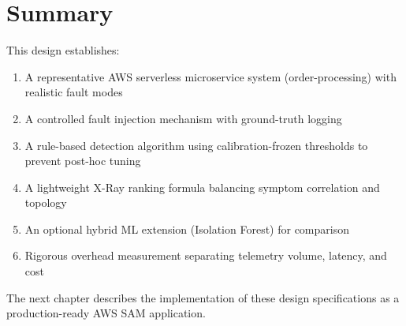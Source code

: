 \section{Summary}

This design establishes:
\begin{enumerate}
    \item A representative AWS serverless microservice system (order-processing) with realistic fault modes
    \item A controlled fault injection mechanism with ground-truth logging
    \item A rule-based detection algorithm using calibration-frozen thresholds to prevent post-hoc tuning
    \item A lightweight X-Ray ranking formula balancing symptom correlation and topology
    \item An optional hybrid ML extension (Isolation Forest) for comparison
    \item Rigorous overhead measurement separating telemetry volume, latency, and cost
\end{enumerate}

The next chapter describes the implementation of these design specifications as a production-ready AWS SAM application.
